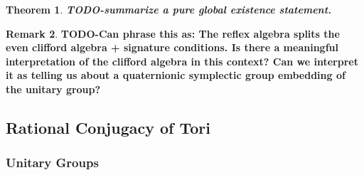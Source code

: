 \documentclass{article}
\theoremstyle{plain}
\newtheorem{theorem}{Theorem}[section]
\theoremstyle{definition}
\newtheorem{remark}[theorem]{Remark}
\numberwithin{equation}{section}
\newcommand{\TODO}[1]{\textbf{TODO-#1}}
\begin{document}
\begin{theorem}
\TODO{summarize a pure global existence statement.}
\end{theorem}

\begin{remark}
\TODO{Can phrase this as: The reflex algebra splits the even clifford algebra + signature conditions.
Is there a meaningful interpretation of the clifford algebra in this context?
Can we interpret it as telling us about a quaternionic symplectic group embedding of the unitary group?}
\end{remark}


\subsection{Rational Conjugacy of Tori}

\subsubsection{Unitary Groups}
\end{document}
